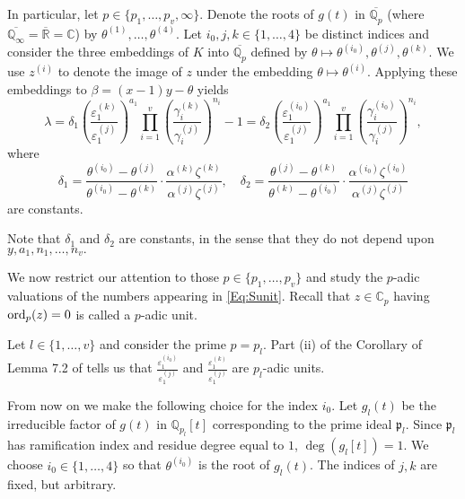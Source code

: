 In particular, let $p \in \{p_1, \dots, p_v, \infty\}$. Denote the roots of $g(t)$ in $\overline{\mathbb{Q}_p}$ (where $\overline{\mathbb{Q}_{\infty}} = \overline{\mathbb{R}} = \mathbb{C}$) by $\theta^{(1)}, \dots, \theta^{(4)}$. Let $i_0, j, k \in \{1, \dots, 4\}$ be distinct indices and consider the three embeddings of $K$ into $\overline{\mathbb{Q}_p}$ defined by $\theta \mapsto \theta^{(i_0)}, \theta^{(j)}, \theta^{(k)}$. We use $z^{(i)}$ to denote the image of $z$ under the embedding $\theta \mapsto \theta^{(i)}$. Applying these embeddings to $\beta = (x-1)y - \theta$ yields
\begin{equation}\label{Eq:Sunit}
\lambda = \delta_1 \left( \frac{\varepsilon_1^{(k)}}{\varepsilon_1^{(j)}}\right)^{a_1}\prod_{i = 1}^v \left( \frac{\gamma_i^{(k)}}{\gamma_i^{(j)}}\right)^{n_i} - 1 = \delta_2 \left( \frac{\varepsilon_1^{(i_0)}}{\varepsilon_1^{(j)}}\right)^{a_1} \prod_{i = 1}^v \left( \frac{\gamma_i^{(i_0)}}{\gamma_i^{(j)}}\right)^{n_i},
\end{equation}
where
\[\delta_1 = \frac{\theta^{(i_0)} - \theta^{(j)}}{\theta^{(i_0)} - \theta^{(k)}}\cdot\frac{\alpha^{(k)}\zeta^{(k)}}{\alpha^{(j)}\zeta^{(j)}}, \quad \delta_2 = \frac{\theta^{(j)} - \theta^{(k)}}{\theta^{(k)} - \theta^{(i_0)}}\cdot \frac{\alpha^{(i_0)}\zeta^{(i_0)}}{\alpha^{(j)}\zeta^{(j)}}\]
are constants. 

Note that $\delta_1$ and $\delta_2$ are constants, in the sense that they do not depend upon $y,a_1,n_1, \dots, n_v.$







We now restrict our attention to those $p \in \{p_1, \dots, p_v\}$ and study the $p$-adic valuations of the numbers appearing in \eqref{Eq:Sunit}. Recall that $z \in \mathbb{C}_p$ having $\operatorname{ord}_p(z) = 0$ is called a $p$-adic unit. 

Let $l \in \{1, \dots, v\}$ and consider the prime $p = p_l$. Part (ii) of the Corollary of Lemma 7.2 of \cite{TW3} tells us that $\frac{\varepsilon_1^{(i_0)}}{\varepsilon_1^{(j)}}$ and $\frac{\varepsilon_1^{(k)}}{\varepsilon_1^{(j)}}$ are $p_l$-adic units. 

From now on we make the following choice for the index $i_0$. Let $g_l(t)$ be the irreducible factor of $g(t)$ in $\mathbb{Q}_{p_l}[t]$ corresponding to the prime ideal $\mathfrak{p}_l$. Since $\mathfrak{p}_l$ has ramification index and residue degree equal to $1$, $\deg(g_l[t]) = 1$. We choose $i_0 \in \{1, \dots, 4\}$ so that $\theta^{(i_0)}$ is the root of $g_l(t)$. The indices of $j,k$ are fixed, but arbitrary. 

